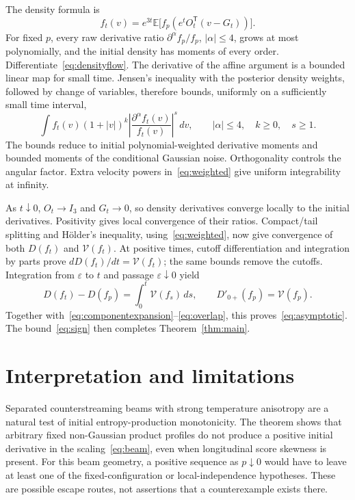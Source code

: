 \documentclass[11pt]{article}
\numberwithin{equation}{section}
\newcommand{\E}{\mathbb E}
\newcommand{\Dzero}{D'_{0+}}
\begin{document}
The density formula is
\begin{equation}\label{eq:densityflow}
 f_t(v)=e^{3t}\E\bigl[f_p(e^tO_t^{\mathsf T}(v-G_t))\bigr].
\end{equation}
For fixed \(p\), every raw derivative ratio
\(\partial^\alpha f_p/f_p\), \(|\alpha|\leq4\), grows at most
polynomially, and the initial density has moments of every order.
Differentiate~\eqref{eq:densityflow}. The derivative of the affine
argument is a bounded linear map for small time. Jensen's inequality
with the posterior density weights, followed by change of variables,
therefore bounds, uniformly on a sufficiently small time interval,
\begin{equation}\label{eq:weighted}
 \int f_t(v)(1+|v|)^k
       \left|\frac{\partial^\alpha f_t(v)}{f_t(v)}\right|^s\,dv,
 \qquad |\alpha|\leq4,\quad k\geq0,\quad s\geq1.
\end{equation}
The bounds reduce to initial polynomial-weighted derivative moments
and bounded moments of the conditional Gaussian noise. Orthogonality
controls the angular factor. Extra velocity powers in~\eqref{eq:weighted}
give uniform integrability at infinity.

As \(t\downarrow0\), \(O_t\to I_3\) and \(G_t\to0\), so density
derivatives converge locally to the initial derivatives. Positivity
gives local convergence of their ratios. Compact/tail splitting and
H\"older's inequality, using~\eqref{eq:weighted}, now give convergence
of both \(D(f_t)\) and \(\mathcal V(f_t)\). At positive times, cutoff
differentiation and integration by parts prove
\(dD(f_t)/dt=\mathcal V(f_t)\); the same bounds remove the cutoffs.
Integration from \(\varepsilon\) to \(t\) and passage
\(\varepsilon\downarrow0\) yield
\[
 D(f_t)-D(f_p)=\int_0^t\mathcal V(f_s)\,ds,
 \qquad \Dzero(f_p)=\mathcal V(f_p).
\]
Together with~\eqref{eq:componentexpansion}--\eqref{eq:overlap}, this
proves~\eqref{eq:asymptotic}. The bound~\eqref{eq:sign} then completes
Theorem~\ref{thm:main}.

\section{Interpretation and limitations}

Separated counterstreaming beams with strong temperature anisotropy are
a natural test of initial entropy-production monotonicity. The theorem
shows that arbitrary fixed non-Gaussian product profiles do not produce
a positive initial derivative in the scaling~\eqref{eq:beam}, even when
longitudinal score skewness is present. For this beam geometry, a positive
sequence as \(p\downarrow0\) would have to leave at least one of the
fixed-configuration or local-independence hypotheses. These are possible
escape routes, not assertions that a counterexample exists there.
\end{document}
